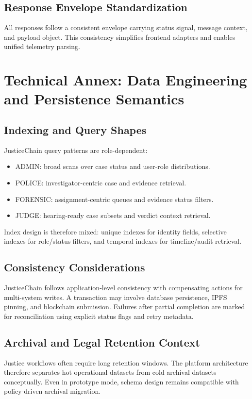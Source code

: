 \documentclass[conference]{IEEEtran}
\begin{document}
\subsection{Response Envelope Standardization}
All responses follow a consistent envelope carrying status signal, message context, and payload object. This consistency simplifies frontend adapters and enables unified telemetry parsing.

\section{Technical Annex: Data Engineering and Persistence Semantics}
\subsection{Indexing and Query Shapes}
JusticeChain query patterns are role-dependent:
\begin{itemize}
    \item ADMIN: broad scans over case status and user-role distributions.
    \item POLICE: investigator-centric case and evidence retrieval.
    \item FORENSIC: assignment-centric queues and evidence status filters.
    \item JUDGE: hearing-ready case subsets and verdict context retrieval.
\end{itemize}

Index design is therefore mixed: unique indexes for identity fields, selective indexes for role/status filters, and temporal indexes for timeline/audit retrieval.

\subsection{Consistency Considerations}
JusticeChain follows application-level consistency with compensating actions for multi-system writes. A transaction may involve database persistence, IPFS pinning, and blockchain submission. Failures after partial completion are marked for reconciliation using explicit status flags and retry metadata.

\subsection{Archival and Legal Retention Context}
Justice workflows often require long retention windows. The platform architecture therefore separates hot operational datasets from cold archival datasets conceptually. Even in prototype mode, schema design remains compatible with policy-driven archival migration.
\end{document}
